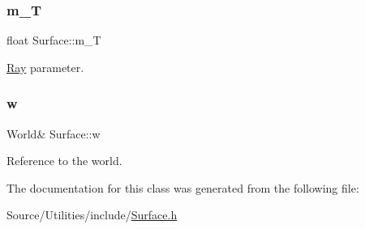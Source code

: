 \subsubsection{\texorpdfstring{m\+\_\+T}{m\_T}}
{\footnotesize\ttfamily float Surface\+::m\+\_\+T}

\hyperlink{class_ray}{Ray} parameter. \hypertarget{class_surface_adc3a6c73b06a4eebb40cc9083d6a956b}{}\label{class_surface_adc3a6c73b06a4eebb40cc9083d6a956b} 
\subsubsection{\texorpdfstring{w}{w}}
{\footnotesize\ttfamily World\& Surface\+::w}

Reference to the world. 

The documentation for this class was generated from the following file\+:\begin{DoxyCompactItemize}
\item 
Source/\+Utilities/include/\hyperlink{_surface_8h}{Surface.\+h}\end{DoxyCompactItemize}
